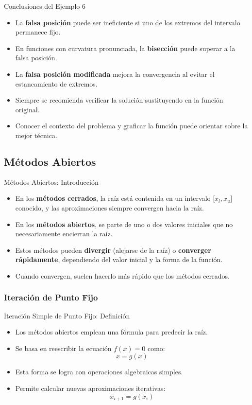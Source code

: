 \documentclass[../../main.tex]{subfiles}
\begin{document}
\begin{frame}{Conclusiones del Ejemplo 6}
\begin{itemize}
  \item La \textbf{falsa posición} puede ser ineficiente si uno de los extremos del intervalo permanece fijo.
  \item En funciones con curvatura pronunciada, la \textbf{bisección} puede superar a la falsa posición.
  \item La \textbf{falsa posición modificada} mejora la convergencia al evitar el estancamiento de extremos.
  \item Siempre se recomienda verificar la solución sustituyendo en la función original.
  \item Conocer el contexto del problema y graficar la función puede orientar sobre la mejor técnica.
\end{itemize}
\end{frame}

\subsection{Métodos Abiertos}
\begin{frame}{Métodos Abiertos: Introducción}
\begin{itemize}
  \item En los \textbf{métodos cerrados}, la raíz está contenida en un intervalo [\( x_l, x_u \)] conocido, y las aproximaciones siempre convergen hacia la raíz.
  \item En los \textbf{métodos abiertos}, se parte de uno o dos valores iniciales que no necesariamente encierran la raíz.
  \item Estos métodos pueden \textbf{divergir} (alejarse de la raíz) o \textbf{converger rápidamente}, dependiendo del valor inicial y la forma de la función.
  \item Cuando convergen, suelen hacerlo más rápido que los métodos cerrados.
\end{itemize}
\end{frame}

\subsubsection{Iteración de Punto Fijo}

\begin{frame}{Iteración Simple de Punto Fijo: Definición}
\begin{itemize}
  \item Los métodos abiertos emplean una fórmula para predecir la raíz.
  \item Se basa en reescribir la ecuación \( f(x) = 0 \) como:
  \[ x = g(x) \]
  \item Esta forma se logra con operaciones algebraicas simples.
  \item Permite calcular nuevas aproximaciones iterativas:
  \[ x_{i+1} = g(x_i) \]
\end{itemize}
\end{frame}
\end{document}
